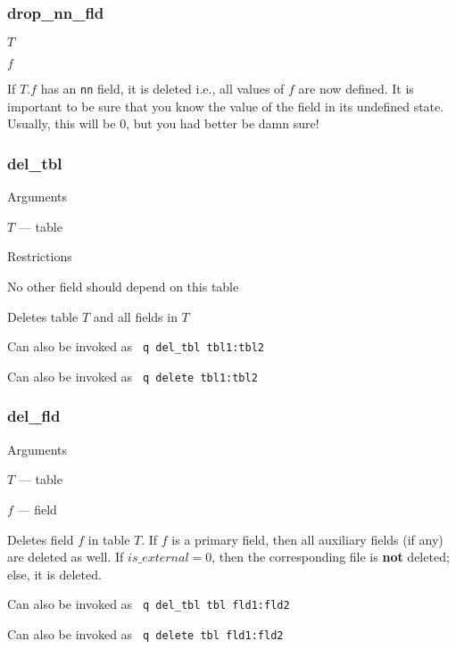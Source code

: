 \documentclass{report}
\begin{document}
\subsubsection{drop\_nn\_fld}
\label{drop_nn_fld}
\be
\item \(T\) 
\item \(f\)
\ee

If \(T.f\) has an {\tt nn} field, it is deleted i.e., all values of
\(f\) are now defined. It is important to be sure that you know the
value of the field in its undefined state. Usually, this will be 0, but
you had better be damn sure!


\subsubsection{del\_tbl}
\label{del_tbl}

Arguments
\be
\item \(T\) --- table
\ee

Restrictions
\be
\item No other field should depend on this table
\ee

Deletes table \(T\) and all fields in \(T\)

Can also be invoked as \verb+ q del_tbl tbl1:tbl2+

Can also be invoked as \verb+ q delete tbl1:tbl2+

\subsubsection{del\_fld}
\label{del_fld}

Arguments 
\be
\item \(T\) --- table
\item \(f\) --- field
\ee

Deletes field \(f\) in table \(T\). If \(f\) is a primary field, then
all auxiliary fields (if any) are deleted as well. If \(is\_external = 0\), then the corresponding file is {\bf not} deleted; else, it is deleted.

Can also be invoked as \verb+ q del_tbl tbl fld1:fld2+

Can also be invoked as \verb+ q delete tbl fld1:fld2+

\end{document}
